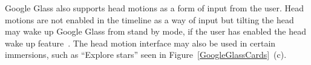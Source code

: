 Google Glass also supports head motions as a form of input from the user. Head motions are not enabled in the timeline as a way of input but tilting the head may wake up Google Glass from stand by mode, if the user has enabled the head wake up feature~\cite{headWakeUp}. The head motion interface may also be used in certain immersions, such as ``Explore stars'' seen in Figure~\ref{GoogleGlassCards}~(c).




